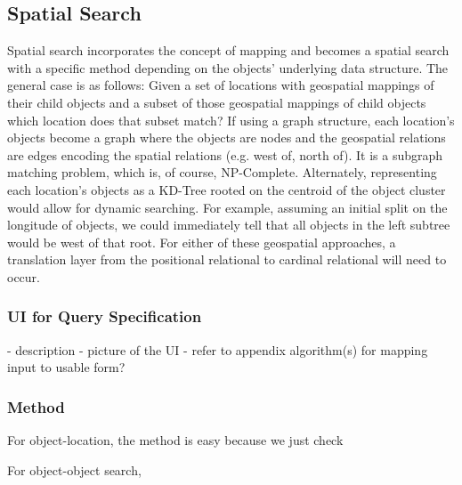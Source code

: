 \subsection{Spatial Search}
Spatial search incorporates the concept of mapping and becomes a spatial search with a specific method depending on the objects' underlying data structure. 
The general case is as follows: Given a set of locations with geospatial mappings of their child objects and a subset of those geospatial mappings of child objects which location does that subset match? 
If using a graph structure, each location's objects become a graph where the objects are nodes and the geospatial relations are edges encoding the spatial relations (e.g. west of, north of). It is a subgraph matching problem, which is, of course, NP-Complete. 
Alternately, representing each location's objects as a KD-Tree rooted on the centroid of the object cluster would allow for dynamic searching. For example, assuming an initial split on the longitude of objects, we could immediately tell that all objects in the left subtree would be west of that root. 
For either of these geospatial approaches, a translation layer from the positional relational to cardinal relational will need to occur.

\subsubsection{UI for Query Specification}
- description
- picture of the UI
- refer to appendix algorithm(s) for mapping input to usable form?

\subsubsection{Method}
For object-location, the method is easy because we just check 

For object-object search, 


